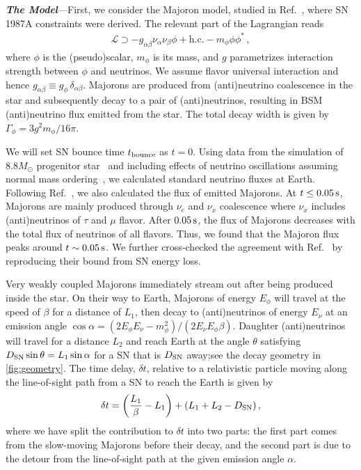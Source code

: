 \documentclass[aps,twocolumn,prl,showpacs,showkeys,preprintnumbers,superscriptaddress,nobibnotes,floatfix,longbibliography,notitlepage,nofootinbib]{revtex4-2}
\begin{document}
\textbf{\textit{The Model}}---First, we consider the Majoron model, studied in Ref.~\cite{Fiorillo:2022cdq}, where SN 1987A constraints were derived.
The relevant part of the Lagrangian reads
\begin{align}
\mathcal{L} \supset -g_{\alpha\beta} \nu_\alpha \nu_\beta \phi + \text{h.c.} - m_\phi \phi\phi^*\,,
\end{align}
where $\phi$ is the (pseudo)scalar, $m_\phi$ is its mass, and $g$ parametrizes interaction strength between $\phi$ and neutrinos.
We assume flavor universal interaction and hence $g_{\alpha\beta}\equiv g_\phi \, \delta_{\alpha\beta}$. 
Majorons are produced from (anti)neutrino coalescence in the star and subsequently decay to a pair of (anti)neutrinos, resulting in BSM (anti)neutrino flux emitted from the star.
The total decay width is given by $\Gamma_\phi = 3g^2 m_\phi/16 \pi$.

We will set SN bounce time $t_{\rm bounce}$ as $t = 0$.
Using data from the simulation of $8.8 M_\odot$ progenitor star~\cite{Huedepohl2010} and including effects of neutrino oscillations assuming normal mass ordering~\cite{Dighe:1999bi}, we calculated standard neutrino fluxes at Earth. Following Ref.~\cite{Fiorillo:2022cdq}, we also calculated the flux of emitted Majorons.
At $t \leq \unit[0.05]{s}$, Majorons are mainly produced through $\nu_e$ and $\nu_x$ coalescence where $\nu_x$ includes (anti)neutrinos of $\tau$ and $\mu$ flavor.
After $\unit[0.05]{s}$, the flux of Majorons decreases with the total flux of neutrinos of all flavors.
Thus, we found that the Majoron flux peaks around $t \sim \unit[0.05]{s}$.
We further cross-checked the agreement with Ref.~\cite{Fiorillo:2022cdq} by reproducing their bound from SN energy loss. 


Very weakly coupled Majorons immediately stream out after being produced inside the star.
On their way to Earth, Majorons of energy $E_\phi$ will travel at the speed of $\beta$ for a distance of $L_1$, then decay to (anti)neutrinos of energy $E_\nu$ at an emission angle $\cos\alpha = (2 E_\phi E_{\nu} - m^2_\phi)/(2E_{\nu}E_\phi\beta)$.
Daughter (anti)neutrinos will travel for a distance $L_2$ and reach Earth at the angle $\theta$ satisfying $D_{\rm SN} \sin\theta = L_1 \sin\alpha$ for a SN that is $D_{\rm SN}$ away;see the decay geometry in \cref{fig:geometry}.
The time delay, $\delta t$, relative to a relativistic particle moving along the line-of-sight path from a SN to reach the Earth is given by~\cite{Jaeckel:2017tud}
\begin{align}
    \delta t = \left(\frac{L_1}{\beta}-L_1\right) + (L_1 + L_2 -D_{\rm SN})\,,
    \label{eq:deltatexa}
\end{align}
where we have split the contribution to $\delta t$ into two parts: the first part comes from the slow-moving Majorons before their decay, and the second part is due to the detour from the line-of-sight path at the given emission angle $\alpha$. 
\end{document}
